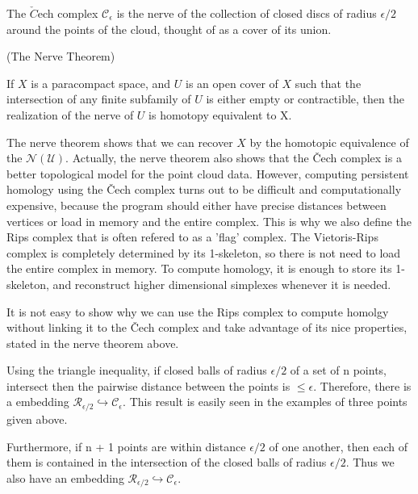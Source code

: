 \documentclass[11pt,a4paper]{report}
\begin{document}
              
              The $\check{C}$ech complex $\mathcal{C}_\epsilon$ is the nerve of the collection of closed discs of radius $\epsilon/2$ around the points of the cloud, thought of as a cover of its union.
              \begin{thm}(The Nerve Theorem)
              
            If $X$ is a paracompact space, and $U$ is an open cover of $X$ such that the
            intersection of any finite subfamily of $U$ is either empty or contractible,
            then the realization of the nerve of $U$ is homotopy equivalent to X.\cite{hatcher}
            
              \end{thm}
              
            The nerve theorem shows that we can recover $X$ by the homotopic equivalence of the $\mathcal{N}(\mathcal{U})$. Actually, the nerve theorem also shows that the \v{C}ech complex
            is a better topological model for the point cloud data. However, computing persistent homology using the \v{C}ech complex turns out to be difficult and computationally expensive, because the program should either have precise distances between vertices or load in memory and the entire complex. This is why we also define the Rips complex that is often refered to as a 'flag' complex. The Vietoris-Rips complex is completely determined by its 1-skeleton, so there is not need to load the entire complex in memory. To compute homology, it is enough to store its 1-skeleton, and reconstruct higher dimensional simplexes whenever it is needed.
            
            It is not easy to show why we can use the Rips complex to compute homolgy without linking
            it to the \v{C}ech complex and take advantage of its nice properties, stated in the nerve theorem above.
            
            Using the triangle inequality, if closed balls of radius $\epsilon/2$ of a set of n points,
            intersect then the pairwise distance between the points is $\leq \epsilon$. Therefore, 
            there is a embedding $\mathcal{R}_{\epsilon/2} \hookrightarrow \mathcal{C}_\epsilon$. This result is easily seen in the examples of three points given above. 
            
            Furthermore, if n + 1 points are within distance $\epsilon/2$ of one another, then
            each of them is contained in the intersection of the closed balls of radius $\epsilon/2$. Thus we also have an embedding $\mathcal{R}_{\epsilon/2} \hookrightarrow \mathcal{C}_\epsilon$.
            
\end{document}
